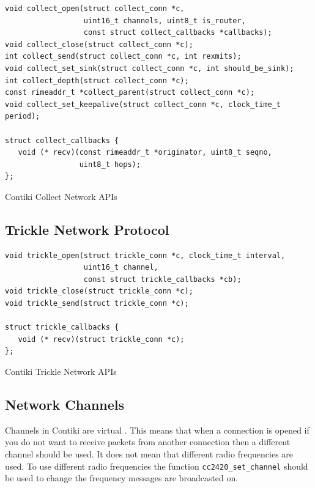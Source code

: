 \begin{listing}[H]
\begin{verbatim}
void collect_open(struct collect_conn *c,
                  uint16_t channels, uint8_t is_router,
                  const struct collect_callbacks *callbacks);
void collect_close(struct collect_conn *c);
int collect_send(struct collect_conn *c, int rexmits);
void collect_set_sink(struct collect_conn *c, int should_be_sink);
int collect_depth(struct collect_conn *c);
const rimeaddr_t *collect_parent(struct collect_conn *c);
void collect_set_keepalive(struct collect_conn *c, clock_time_t period);

struct collect_callbacks {
   void (* recv)(const rimeaddr_t *originator, uint8_t seqno,
                 uint8_t hops);
};
\end{verbatim}
\caption{Contiki Collect Network APIs}
\end{listing}


\subsection{Trickle Network Protocol}

\begin{listing}[H]
\begin{verbatim}
void trickle_open(struct trickle_conn *c, clock_time_t interval,
                  uint16_t channel,
                  const struct trickle_callbacks *cb);
void trickle_close(struct trickle_conn *c);
void trickle_send(struct trickle_conn *c);

struct trickle_callbacks {
   void (* recv)(struct trickle_conn *c);
};
\end{verbatim}
\caption{Contiki Trickle Network APIs}
\end{listing}


\subsection{Network Channels}

Channels in Contiki are virtual \cite{tel-aviv-contiki-exercises, Dunkels:2007:ACA:1322263.1322295}. This means that when a connection is opened if you do not want to receive packets from another connection then a different channel should be used. It does not mean that different radio frequencies are used. To use different radio frequencies the function \verb|cc2420_set_channel| should be used to change the frequency messages are broadcasted on.


